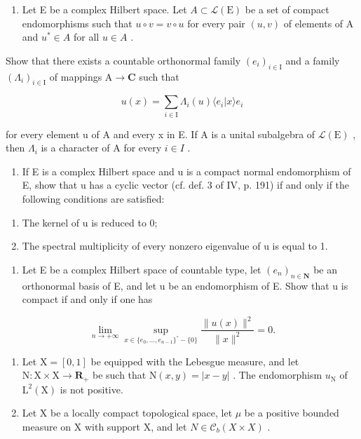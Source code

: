\begin{enumerate}
\def\labelenumi{\arabic{enumi})}
\setcounter{enumi}{10}
\tightlist
\item
  Let E be a complex Hilbert space. Let \(A \subset \mathcal{L}(\mathrm{E})\) be a set of compact endomorphisms such that \(u \circ v = v \circ u\) for every pair \((u, v)\) of elements of A and \(u^{*} \in A\) for all \(u \in A\) .
\end{enumerate}

Show that there exists a countable orthonormal family \((e_i)_{i\in \mathrm{I}}\) and a family \((\Lambda_i)_{i\in \mathrm{I}}\) of mappings \(\mathrm{A}\to \mathbf{C}\) such that

\[
u (x) = \sum_ {i \in \mathrm{I}} \Lambda_ {i} (u) \langle e _ {i} | x \rangle e _ {i}
\]

for every element u of A and every x in E. If A is a unital subalgebra of \(\mathcal{L}(\mathrm{E})\) , then \(\Lambda_{i}\) is a character of A for every \(i \in I\) .

\begin{enumerate}
\def\labelenumi{\arabic{enumi})}
\setcounter{enumi}{11}
\tightlist
\item
  If E is a complex Hilbert space and u is a compact normal endomorphism of E, show that u has a cyclic vector (cf. def. 3 of IV, p. 191) if and only if the following conditions are satisfied:
\end{enumerate}

\begin{enumerate}
\def\labelenumi{(\roman{enumi})}
\item
  The kernel of u is reduced to 0;
\item
  The spectral multiplicity of every nonzero eigenvalue of u is equal to 1.
\end{enumerate}

\begin{enumerate}
\def\labelenumi{\arabic{enumi})}
\setcounter{enumi}{12}
\tightlist
\item
  Let E be a complex Hilbert space of countable type, let \((e_{n})_{n\in\mathbf{N}}\) be an orthonormal basis of E, and let u be an endomorphism of E. Show that u is compact if and only if one has
\end{enumerate}

\[
\lim _ {n \to + \infty} \sup _ {x \in \{e _ {0}, \dots , e _ {n - 1} \} ^ {\circ} - \{0 \}} \frac {\| u (x) \| ^ {2}}{\| x \| ^ {2}} = 0.
\]

\begin{enumerate}
\def\labelenumi{\arabic{enumi})}
\setcounter{enumi}{13}
\item
  Let \(\mathrm{X} = [0,1]\) be equipped with the Lebesgue measure, and let \(\mathrm{N}\colon \mathrm{X}\times \mathrm{X}\to \mathbf{R}_{+}\) be such that \(\mathrm{N}(x,y) = |x - y|\) . The endomorphism \(u_{\mathrm{N}}\) of \(\mathrm{L}^2 (\mathrm{X})\) is not positive.
\item
  Let X be a locally compact topological space, let \(\mu\) be a positive bounded measure on X with support X, and let \(N \in \mathcal{C}_{b}(X \times X)\) .
\end{enumerate}

